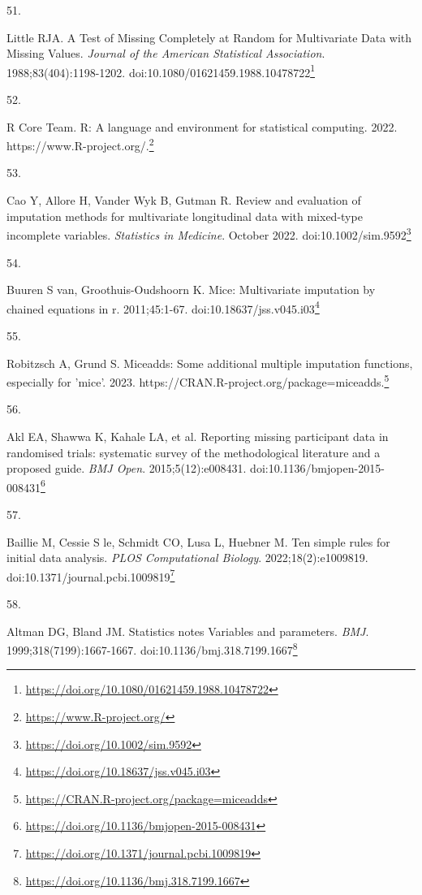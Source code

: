 \documentclass[
  a4paper,
]{book}
\newlength{\cslhangindent}
\newlength{\csllabelwidth}
\newlength{\cslentryspacingunit} %
\newenvironment{CSLReferences}[2] %
 {%
  \setlength{\parindent}{0pt}
  \ifodd #1
  \let\oldpar\par
  \def\par{\hangindent=\cslhangindent\oldpar}
  \fi
  \setlength{\parskip}{#2\cslentryspacingunit}
 }%
 {}
\newcommand{\CSLLeftMargin}[1]{\parbox[t]{\csllabelwidth}{#1}}
\newcommand{\CSLRightInline}[1]{\parbox[t]{\linewidth - \csllabelwidth}{#1}\break}
\renewcommand{\href}[2]{#2\footnote{\url{#1}}}
\begin{document}
\begin{CSLReferences}{0}{0}
\leavevmode{}%
\CSLLeftMargin{51. }%
\CSLRightInline{Little RJA. A Test of Missing Completely at Random for Multivariate Data with Missing Values. \emph{Journal of the American Statistical Association}. 1988;83(404):1198-1202. doi:\href{https://doi.org/10.1080/01621459.1988.10478722}{10.1080/01621459.1988.10478722}}

\leavevmode{}%
\CSLLeftMargin{52. }%
\CSLRightInline{R Core Team. R: A language and environment for statistical computing. 2022. \href{https://www.R-project.org/}{https://www.R-project.org/.}}

\leavevmode{}%
\CSLLeftMargin{53. }%
\CSLRightInline{Cao Y, Allore H, Vander Wyk B, Gutman R. Review and evaluation of imputation methods for multivariate longitudinal data with mixed{-}type incomplete variables. \emph{Statistics in Medicine}. October 2022. doi:\href{https://doi.org/10.1002/sim.9592}{10.1002/sim.9592}}

\leavevmode{}%
\CSLLeftMargin{54. }%
\CSLRightInline{Buuren S van, Groothuis-Oudshoorn K. {\textbraceleft}Mice{\textbraceright}: Multivariate imputation by chained equations in r. 2011;45:1-67. doi:\href{https://doi.org/10.18637/jss.v045.i03}{10.18637/jss.v045.i03}}

\leavevmode{}%
\CSLLeftMargin{55. }%
\CSLRightInline{Robitzsch A, Grund S. Miceadds: Some additional multiple imputation functions, especially for 'mice'. 2023. \href{https://CRAN.R-project.org/package=miceadds}{https://CRAN.R-project.org/package=miceadds.}}

\leavevmode{}%
\CSLLeftMargin{56. }%
\CSLRightInline{Akl EA, Shawwa K, Kahale LA, et al. Reporting missing participant data in randomised trials: systematic survey of the methodological literature and a proposed guide. \emph{BMJ Open}. 2015;5(12):e008431. doi:\href{https://doi.org/10.1136/bmjopen-2015-008431}{10.1136/bmjopen-2015-008431}}

\leavevmode{}%
\CSLLeftMargin{57. }%
\CSLRightInline{Baillie M, Cessie S le, Schmidt CO, Lusa L, Huebner M. Ten simple rules for initial data analysis. \emph{PLOS Computational Biology}. 2022;18(2):e1009819. doi:\href{https://doi.org/10.1371/journal.pcbi.1009819}{10.1371/journal.pcbi.1009819}}

\leavevmode{}%
\CSLLeftMargin{58. }%
\CSLRightInline{Altman DG, Bland JM. Statistics notes Variables and parameters. \emph{BMJ}. 1999;318(7199):1667-1667. doi:\href{https://doi.org/10.1136/bmj.318.7199.1667}{10.1136/bmj.318.7199.1667}}


\end{CSLReferences}
\end{document}
